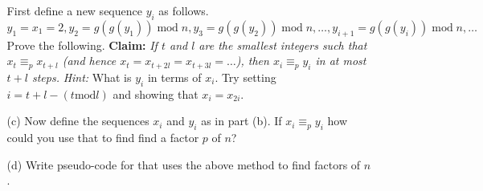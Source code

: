 \documentclass[11pt]{amsart}
\begin{document}
\begin{enumerate}
\begin{itemize}
    First define a new sequence $y_i$ as follows.  
    \[
        y_1 = x_1 = 2, y_2 = g(g(y_1)) \;\text{mod}\;n, y_3 = g(g(y_2))\;\text{mod}\;n, \ldots, y_{i+1} = g(g(y_i))\;\text{mod}\;n, \ldots
    \]
    Prove the following.
    \vskip 3pt
    \noindent
    {\bf Claim:} {\it If $t$ and $l$ are the smallest integers such that $x_{t} \equiv_p x_{t+l}$ (and hence $x_t = x_{t + 2l} = x_{t+3l} = \ldots$), then $x_i \equiv_p y_i$ in at most $t+l$ steps.}
    \vskip 3pt
    \emph{Hint:} What is $y_i$ in terms of $x_i$.  Try setting $i = t + l - (t \text{mod} l)$ and showing that $x_i = x_{2i}$.
    \item[(c)]  Now define the sequences $x_i$ and $y_i$ as in part (b).  If $x_i \equiv_p y_i$ how could you use that to find find a factor $p$ of $n$?
    \item[(d)]  Write pseudo-code for that uses the above method to find factors of $n$.
    \end{itemize}
\end{enumerate}
\end{document}
